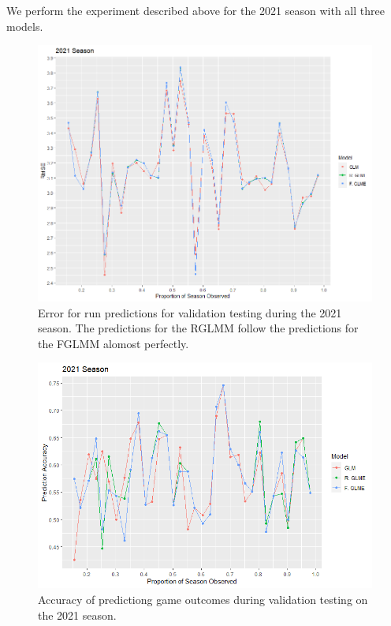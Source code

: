\documentclass [52pt] {article}
\begin{document}
We perform the experiment described above for the 2021 season with all three models.  
\begin{figure}
        \centering
        \includegraphics[scale = 0.6]{Plots/RMSE2021.png}
        \caption{Error for run predictions for validation testing during the 2021 season.  The predictions for the RGLMM follow the predictions for the FGLMM alomost perfectly.}
        \label{fig : validation_RMSE}
    \end{figure}
    
    \begin{figure}
        \centering
        \includegraphics[scale = 0.7]{Plots/Accuracy2021.png}
        \caption{Accuracy of predictiong game outcomes during validation testing on the 2021 season.}
        \label{fig : validation_accuracy}
    \end{figure}
    
\end{document}

